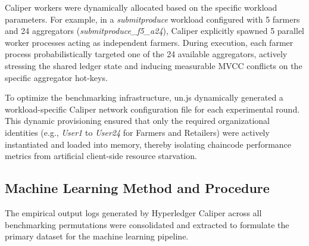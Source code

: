 \documentclass[manuscript,screen]{acmart}
\begin{document}
Caliper workers were dynamically allocated based on the specific workload parameters. For example, in a \textit{submitproduce} workload configured with 5 farmers and 24 aggregators (\textit{submitproduce\_f5\_a24}), Caliper explicitly spawned 5 parallel worker processes acting as independent farmers. During execution, each farmer process probabilistically targeted one of the 24 available aggregators, actively stressing the shared ledger state and inducing measurable MVCC conflicts on the specific aggregator hot-keys.

To optimize the benchmarking infrastructure, 
un.js dynamically generated a workload-specific Caliper network configuration file for each experimental round. This dynamic provisioning ensured that only the required organizational identities (e.g., \textit{User1} to \textit{User24} for Farmers and Retailers) were actively instantiated and loaded into memory, thereby isolating chaincode performance metrics from artificial client-side resource starvation.

\begin{table}[ht]
\centering
\caption{Benchmark Workload Configurations and Participant Mapping}
\label{tab:workload_mapping}
\end{table}


\subsection{Machine Learning Method and Procedure}

The empirical output logs generated by Hyperledger Caliper across all benchmarking permutations were consolidated and extracted to formulate the primary dataset for the machine learning pipeline.
\end{document}
